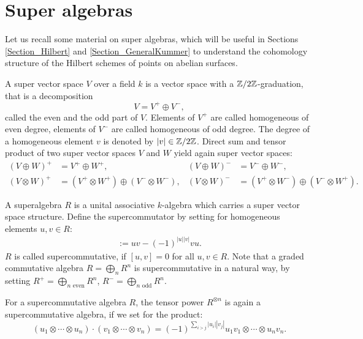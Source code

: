 \section{Super algebras} \label{SuperSection}
Let us recall some material on super algebras, which will be useful in Sections \ref{Section_Hilbert} and \ref{Section_GeneralKummer} to understand the cohomology structure of the Hilbert schemes of points on abelian surfaces.
\begin{definition}
 A super vector space $V$ over a field $k$ is a vector space with a $\mathbb{Z}/2\mathbb{Z}$-graduation, that is a decomposition
$$
 V = V^{+} \oplus V^{-},
$$
called the even and the odd part of $V$. Elements of $V^{+}$ are called homogeneous of even degree, elements of $V^{-}$ are called homogeneous of odd degree.
The degree of a homogeneous element $v$ is denoted by $|v|\in \mathbb{Z}/2\mathbb{Z}$.
Direct sum and tensor product of two super vector spaces $V$ and $W$ yield again super vector spaces:
\begin{align*}
 (V\oplus W)^{+} &= V^{+}\oplus W^{+}, & (V\oplus W)^{-} &= V^{-}\oplus W^{-}, \\
 (V\otimes W)^{+} &= (V^{+}\otimes W^{+})\oplus (V^{-}\otimes W^{-}), & (V\otimes W)^{-} &=(V^{+}\otimes W^{-})\oplus (V^{-}\otimes W^{+}).
\end{align*}
\end{definition}
\begin{definition}
A superalgebra $R$ is a unital associative $k$-algebra which carries a super vector space structure. Define the supercommutator by setting for homogeneous elements $u,v \in R$:
\begin{align*}
[u,v] := uv - (-1)^{|u||v|} v u.
\end{align*}
$R$ is called supercommutative, if $[u,v]=0$ for all $u,v\in R$. Note that a graded commutative algebra $R = \bigoplus\limits_n R^n$ is supercommutative in a natural way, by setting $R^{+}=\bigoplus\limits_{n\text{ even}} R^n$, $R^{-}=\bigoplus\limits_{n\text{ odd}} R^n$.

For a supercommutative algebra $R$, the tensor power $R^{\otimes n}$ is again a supercommutative algebra, if we set for the product:
$$
(u_1\otimes\cdots\otimes u_n)\cdot(v_1\otimes\cdots\otimes v_n) 
=  (-1)^{\sum\limits_{i>j}|u_i||v_j|} u_1v_1\otimes\cdots\otimes u_nv_n.
$$
\end{definition}
